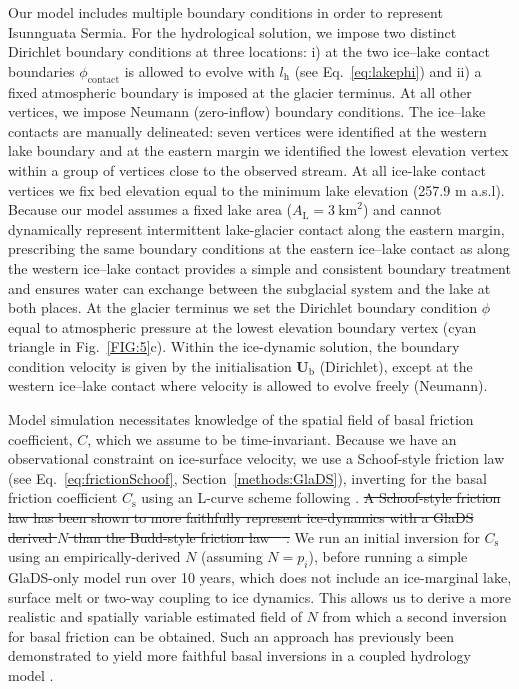 \documentclass[tc, manuscript]{copernicus}
\providecommand{\DIFdel}[1]{{\protect\color{red}\sout{#1}}} %
\providecommand{\DIFdelbegin}{} %
\providecommand{\DIFdelend}{} %
\begin{document}
Our model includes multiple boundary conditions in order to represent Isunnguata Sermia. For the hydrological solution, we impose two distinct Dirichlet boundary conditions at three locations: i) at the two ice--lake contact boundaries $\phi_{\mathrm{contact}}$ is allowed to evolve with $l_{\mathrm{h}}$ (see Eq.~\ref{eq:lakephi}) and ii) a fixed atmospheric boundary is imposed at the glacier terminus. At all other vertices, we impose Neumann (zero-inflow) boundary conditions. The ice--lake contacts are manually delineated: seven vertices were identified at the western lake boundary and at the eastern margin we identified the lowest elevation vertex within a group of vertices close to the observed stream. At all ice-lake contact vertices we fix bed elevation equal to the minimum lake elevation (257.9 m a.s.l). Because our model assumes a fixed lake area ($A_{\mathrm{L}}=3\ \mathrm{km}^2$) and cannot dynamically represent intermittent lake-glacier contact along the eastern margin, prescribing the same boundary conditions at the eastern ice--lake contact as along the western ice--lake contact provides a simple and consistent boundary treatment and ensures water can exchange between the subglacial system and the lake at both places. At the glacier terminus we set the Dirichlet boundary condition $\phi$ equal to atmospheric pressure at the lowest elevation boundary vertex (cyan triangle in Fig.~\ref{FIG:5}c). Within the ice-dynamic solution, the boundary condition velocity is given by the initialisation $\mathbf{U}_{\mathrm{b}}$ (Dirichlet), except at the western ice--lake contact where velocity is allowed to evolve freely (Neumann). 

Model simulation necessitates knowledge of the spatial field of basal friction coefficient, $C$, which we assume to be time-invariant. Because we have an observational constraint on ice-surface velocity, we use a Schoof-style friction law (see Eq.~\ref{eq:frictionSchoof}, Section~\ref{methods:GlaDS}), inverting for the basal friction coefficient $C_{\mathrm{s}}$ using an L-curve scheme following \citet{wolovick2023regularization}. \DIFdelbegin \DIFdel{A Schoof-style friction law has been shown to more faithfully represent ice-dynamics with a GlaDS derived $N$ than the Budd-style friction law \mbox{%
\citep{mcarthur2023basal}}\hskip0pt%
. }\DIFdelend We run an initial inversion for $C_{\mathrm{s}}$ using an empirically-derived $N$ (assuming $N=p_{i}$), before running a simple GlaDS-only model run over 10 years, which does not include an ice-marginal lake, surface melt or two-way coupling to ice dynamics. This allows us to derive a more realistic and spatially variable estimated field of $N$ from which a second inversion for basal friction can be obtained. Such an approach has previously been demonstrated to yield more faithful basal inversions in a coupled hydrology model \citep{ehrenfeucht2023seasonal,mcarthur2023basal}. 
\end{document}
